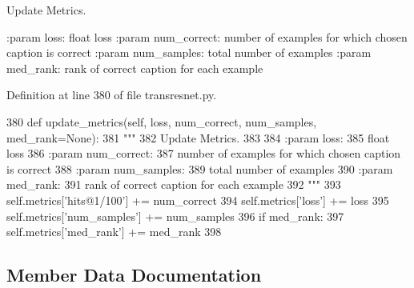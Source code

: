 \begin{DoxyVerb}Update Metrics.

:param loss:
    float loss
:param num_correct:
    number of examples for which chosen caption is correct
:param num_samples:
    total number of examples
:param med_rank:
    rank of correct caption for each example
\end{DoxyVerb}
 

Definition at line 380 of file transresnet.\+py.


\begin{DoxyCode}
380     \textcolor{keyword}{def }update\_metrics(self, loss, num\_correct, num\_samples, med\_rank=None):
381         \textcolor{stringliteral}{"""}
382 \textcolor{stringliteral}{        Update Metrics.}
383 \textcolor{stringliteral}{}
384 \textcolor{stringliteral}{        :param loss:}
385 \textcolor{stringliteral}{            float loss}
386 \textcolor{stringliteral}{        :param num\_correct:}
387 \textcolor{stringliteral}{            number of examples for which chosen caption is correct}
388 \textcolor{stringliteral}{        :param num\_samples:}
389 \textcolor{stringliteral}{            total number of examples}
390 \textcolor{stringliteral}{        :param med\_rank:}
391 \textcolor{stringliteral}{            rank of correct caption for each example}
392 \textcolor{stringliteral}{        """}
393         self.metrics[\textcolor{stringliteral}{'hits@1/100'}] += num\_correct
394         self.metrics[\textcolor{stringliteral}{'loss'}] += loss
395         self.metrics[\textcolor{stringliteral}{'num\_samples'}] += num\_samples
396         \textcolor{keywordflow}{if} med\_rank:
397             self.metrics[\textcolor{stringliteral}{'med\_rank'}] += med\_rank
398 
\end{DoxyCode}


\subsection{Member Data Documentation}
\mbox{\label{classprojects_1_1personality__captions_1_1transresnet_1_1transresnet_1_1TransresnetAgent_a26a11e8d9e70ef2b85a91d812f3b2f01}} 
